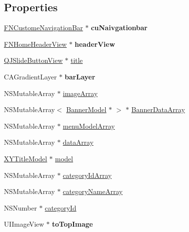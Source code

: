\subsection*{Properties}
\begin{DoxyCompactItemize}
\item 
\mbox{\label{category_home_view_controller_07_08_a7df948d1a83ce4d84f9b2f3a1f59ce13}} 
\mbox{\hyperlink{interface_f_n_custome_navigation_bar}{F\+N\+Custome\+Navigation\+Bar}} $\ast$ {\bfseries cu\+Naivgationbar}
\item 
\mbox{\label{category_home_view_controller_07_08_ab7d15d3fa3e20f4bfde9130a885c17c2}} 
\mbox{\hyperlink{interface_f_n_home_header_view}{F\+N\+Home\+Header\+View}} $\ast$ {\bfseries header\+View}
\item 
\mbox{\hyperlink{interface_q_j_slide_button_view}{Q\+J\+Slide\+Button\+View}} $\ast$ \mbox{\hyperlink{category_home_view_controller_07_08_ab562f83f0d8eaf5d671f9fb4380bdbd9}{title}}
\item 
\mbox{\label{category_home_view_controller_07_08_a7f0c2799482c975ea459d115870a34a1}} 
C\+A\+Gradient\+Layer $\ast$ {\bfseries bar\+Layer}
\item 
N\+S\+Mutable\+Array $\ast$ \mbox{\hyperlink{category_home_view_controller_07_08_a57f429b126a8e00bf2cf11de88ef526b}{image\+Array}}
\item 
N\+S\+Mutable\+Array$<$ \mbox{\hyperlink{interface_banner_model}{Banner\+Model}} $\ast$ $>$ $\ast$ \mbox{\hyperlink{category_home_view_controller_07_08_aea075ab26f5b2f1752cfc50d395cfe28}{Banner\+Data\+Array}}
\item 
N\+S\+Mutable\+Array $\ast$ \mbox{\hyperlink{category_home_view_controller_07_08_acb43b6c6b9f51a4e09c271b9672003f1}{menu\+Model\+Array}}
\item 
N\+S\+Mutable\+Array $\ast$ \mbox{\hyperlink{category_home_view_controller_07_08_a523fcf2e9ff95e0fec63b735f904f312}{data\+Array}}
\item 
\mbox{\hyperlink{interface_x_y_title_model}{X\+Y\+Title\+Model}} $\ast$ \mbox{\hyperlink{category_home_view_controller_07_08_ad9334810ee9ac6d178f02e8a7511574f}{model}}
\item 
N\+S\+Mutable\+Array $\ast$ \mbox{\hyperlink{category_home_view_controller_07_08_a39dcfa2ef30a509bd50b40e378bbc5be}{category\+Id\+Array}}
\item 
N\+S\+Mutable\+Array $\ast$ \mbox{\hyperlink{category_home_view_controller_07_08_aa1d27fec88d9cc9d75d6ab49852c85d2}{category\+Name\+Array}}
\item 
N\+S\+Number $\ast$ \mbox{\hyperlink{category_home_view_controller_07_08_ab54c3da83a7880e47a718cd389ff60b5}{category\+Id}}
\item 
\mbox{\label{category_home_view_controller_07_08_a52e0d5326075df24287eec1aa0c1392a}} 
U\+I\+Image\+View $\ast$ {\bfseries to\+Top\+Image}
\end{DoxyCompactItemize}


